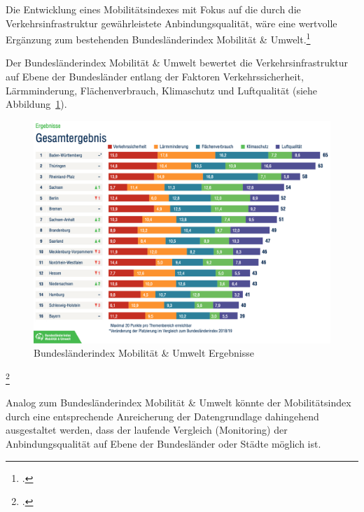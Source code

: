 Die Entwicklung eines Mobilitätsindexes mit Fokus auf die durch die Verkehrsinfrastruktur gewährleistete Anbindungsqualität, wäre eine wertvolle Ergänzung zum bestehenden Bundesländerindex Mobilität \& Umwelt.\footcite{Bundeslaenderindex:1}

Der Bundesländerindex Mobilität \& Umwelt bewertet die Verkehrsinfrastruktur auf Ebene der Bundesländer entlang der Faktoren Verkehrssicherheit, Lärmminderung, Flächenverbrauch, Klimaschutz und Luftqualität (siehe Abbildung~\ref{mob-index2020}).

\begin{figure}[H]
\includegraphics[width=14cm]{abbildungen/mob-index2020}
\centering
\caption[Bundesländerindex Mobilität \& Umwelt Ergebnisse]{Bundesländerindex Mobilität \& Umwelt Ergebnisse\footnotemark}
\label{mob-index2020}
\end{figure}
\footcitetext{Bundeslaenderindex:1}

Analog zum Bundesländerindex Mobilität \& Umwelt könnte der Mobilitätsindex durch eine entsprechende Anreicherung der Datengrundlage dahingehend ausgestaltet werden, dass der laufende Vergleich (Monitoring) der Anbindungsqualität auf Ebene der Bundesländer oder Städte möglich ist.

